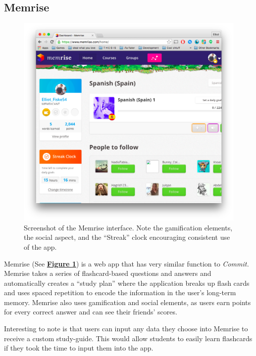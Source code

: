 \subsection{Memrise}

\begin{figure}
	\centering
	\includegraphics[width=1.0\linewidth]{memrise}
	\caption{Screenshot of the Memrise interface. Note the gamification elements, the social aspect, and the ``Streak'' clock encouraging consistent use of the app.}
	\label{fig:memrise}
\end{figure}

\par Memrise (See \textbf{\hyperref[fig:memrise]{Figure \ref*{fig:memrise}}}) is a web app that has very similar function to \textit{Commit.} Memrise takes a series of flashcard-based questions and answers and automatically creates a ``study plan'' where the application breaks up flash cards and uses spaced repetition to encode the information in the user's long-term memory. Memrise also uses gamification and social elements, as users earn points for every correct answer and can see their friends' scores.

\par Interesting to note is that users can input any data they choose into Memrise to receive a custom study-guide. This would allow students to easily learn flashcards if they took the time to input them into the app.

